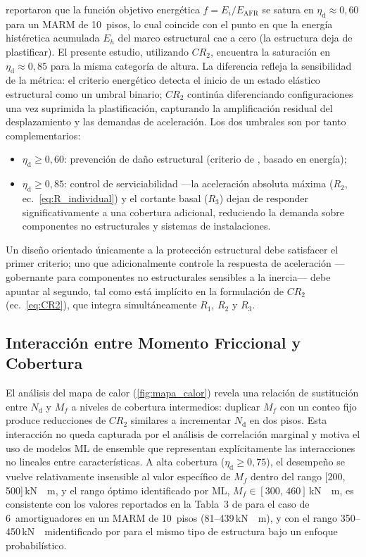 \documentclass[preprint,12pt,authoryear]{elsarticle}
\newcommand{\nd}{N_{\mathrm{d}}}
\newcommand{\etad}{\eta_{\mathrm{d}}}
\newcommand{\Mf}{M_{\!f}}
\newcommand{\KM}{\,\si{kN{\cdot}m}}
\begin{document}
\citet{Jarrahi2020sdee} reportaron que la función objetivo energética
$f = E_i / E_{\mathrm{AFR}}$ se satura en $\etad \approx 0{,}60$ para un
MARM de 10~pisos, lo cual coincide con el punto en que la energía histéretica
acumulada $E_h$ del marco estructural cae a cero (la estructura deja de
plastificar). El presente estudio, utilizando $CR_2$, encuentra la saturación
en $\etad \approx 0{,}85$ para la misma categoría de altura. La diferencia
refleja la sensibilidad de la métrica: el criterio energético detecta el inicio
de un estado elástico estructural como un umbral binario; $CR_2$ continúa
diferenciando configuraciones una vez suprimida la plastificación, capturando
la amplificación residual del desplazamiento y las demandas de aceleración.
Los dos umbrales son por tanto complementarios:
\begin{itemize}
    \item $\etad \geq 0{,}60$: prevención de daño estructural (criterio de
          \citealt{Jarrahi2020sdee}, basado en energía);
    \item $\etad \geq 0{,}85$: control de serviciabilidad ---la aceleración
          absoluta máxima ($R_2$, ec.~\ref{eq:R_individual}) y el cortante
          basal ($R_3$) dejan de responder significativamente a una cobertura
          adicional, reduciendo la demanda sobre componentes no estructurales
          y sistemas de instalaciones.
\end{itemize}
Un diseño orientado únicamente a la protección estructural debe satisfacer el
primer criterio; uno que adicionalmente controle la respuesta de aceleración
---gobernante para componentes no estructurales sensibles a la inercia---
debe apuntar al segundo, tal como está implícito en la formulación de $CR_2$
(ec.~\ref{eq:CR2}), que integra simultáneamente $R_1$, $R_2$ y $R_3$.

\subsection{Interacción entre Momento Friccional y Cobertura}

El análisis del mapa de calor (\cref{fig:mapa_calor}) revela una relación de
sustitución entre $\nd$ y $\Mf$ a niveles de cobertura intermedios: duplicar
$\Mf$ con un conteo fijo produce reducciones de $CR_2$ similares a incrementar
$\nd$ en dos pisos. Esta interacción no queda capturada por el análisis de
correlación marginal y motiva el uso de modelos ML de ensemble que representan
explícitamente las interacciones no lineales entre características. A alta
cobertura ($\etad \geq 0{,}75$), el desempeño se vuelve relativamente insensible
al valor específico de $\Mf$ dentro del rango [200,\,500]\KM, y el rango óptimo identificado por ML, $\Mf \in [300,\,460]$\KM, es consistente
con los valores reportados en la Tabla~3 de \citet{Jarrahi2020sdee} para el
caso de 6~amortiguadores en un MARM de 10~pisos (81--439\KM), y con el rango
350--450\KM identificado por \citet{Ponce2026} para el mismo tipo de estructura
bajo un enfoque probabilístico.
\end{document}
